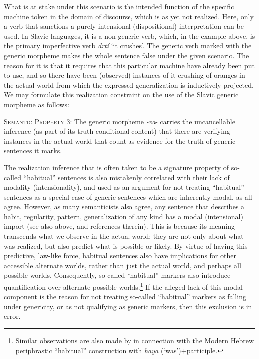 \documentclass[output=paper,colorlinks,citecolor=brown]{langscibook}
\begin{document}
\noindent
What is at stake under this scenario is the intended function
of the specific machine token in the domain of discourse, which is as yet not realized.
Here, only a verb that sanctions a purely intensional (dispositional) interpretation can be used. In
Slavic languages, it is a non-generic verb,
which, in the example above, is the primary imperfective verb \textit{drtí} `it crushes'.
The generic verb marked with the generic morpheme makes the whole sentence false under the given scenario. The reason for it is that it
requires that this particular machine have already been put to use, and so
there have been (observed) instances of it crushing of oranges in the actual world from which the expressed generalization is inductively projected.
We may formulate this realization constraint on the use of the Slavic generic morpheme as follows:

\eanoraggedright\label{ex:semprop3} \textsc{Semantic Property 3}: The generic morpheme \textit{-va}- carries the uncancellable inference (as part of its truth-conditional content) that there are verifying instances in the actual world that count as evidence for the truth of generic sentences it marks.
\z

\noindent
The realization inference that is often taken to be a signature property of so-called ``habitual'' sentences is also mistakenly correlated with their lack of modality (intensionality), and used as an argument for not treating ``habitual'' sentences as a special case of generic sentences which are inherently modal, as all agree.
However, as many semanticists also agree, any sentence that
describes a habit, regularity, pattern,  generalization of any kind
has a modal (intensional) import (see also  above, and references therein). This is because its meaning transcends what we observe in the actual world; they are not only about what was realized, but also predict what is possible or likely.
By virtue of having this predictive, law-like force, habitual sentences also have
implications for other accessible alternate worlds, rather than just the actual world, and perhaps all possible worlds. Consequently, so-called ``habitual'' markers also introduce quantification over alternate possible worlds.\footnote{Similar observations are also made by  \citet{bonehdoron2010} in connection
with the Modern Hebrew periphrastic ``habitual'' construction with
\textit{haya} (`was')+participle.} If the alleged lack of this modal component is the reason for not treating so-called ``habitual'' markers as falling under genericity, or as not qualifying as generic markers, then
this exclusion is in error.
\end{document}
